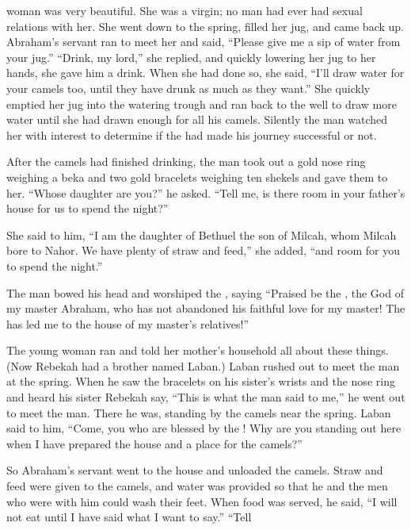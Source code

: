 {woman was very
beautiful.
She was a virgin;
no
man
had ever had sexual relations
with her. She went down
to the spring,
filled
her jug,
and came back up.
Abraham’s servant
ran
to meet
her and said,
“Please
give me
a
sip
of water
from your jug.”
“Drink,
my lord,”
she replied,
and quickly
lowering
her jug
to her hands,
she gave him a drink.
When
she
had done so, she
said,
“I’ll
draw
water
for your camels
too, until
they have drunk as much as they want.”
She quickly
emptied
her jug
into
the watering trough
and ran
back to
the well
to draw
more water until she had drawn
enough for all
his camels.
Silently
the man
watched her with interest
to determine
if the
{}
had made his journey
successful
or not.
\par }{\PP {}After
the camels
had finished
drinking,
the man
took
out a gold
nose ring
weighing
a beka
and two
gold
bracelets
weighing
ten shekels and gave them to her.
“Whose
daughter
are you?” he asked. “Tell
me,
is there
room in your father’s
house
for us to spend the night?”
\par }{\PP {}She said
to him,
“I am
the daughter
of Bethuel
the son
of Milcah,
whom
Milcah bore
to Nahor.
We have
plenty
of straw
and feed,”
she added, “and room
for you
to spend the night.”
\par }{\PP {}The man
bowed
his head and worshiped
the {},
saying
“Praised
be the
{}, the God
of my master
Abraham,
who has
not
abandoned
his faithful
love for my master! The
{}
has led
me to the house
of my master’s
relatives!”
\par }{\PP {}The young
woman ran
and told
her mother’s
household
all about
these things.
(Now Rebekah
had a brother
named
Laban.) Laban
rushed
out
to
meet the man
at the spring.
When
he saw
the
bracelets
on
his
sister’s
wrists
and the nose ring
and heard
his
sister
Rebekah
say, “This is what
the man
said
to
me,” he went
out to
meet the man.
There
he was, standing
by the camels
near the spring.
Laban said
to him, “Come,
you who are blessed
by the
{}! Why
are you standing
out here
when I
have prepared
the house
and a place
for the camels?”
\par }{\PP {}So
Abraham’s servant went
to the house
and unloaded
the camels.
Straw
and feed
were given to the camels,
and water
was provided
so that
he and the men
who were with
him could wash
their feet.
When food
was served,
he said,
“I will not
eat
until
I have said
what I want to say.” “Tell
}
